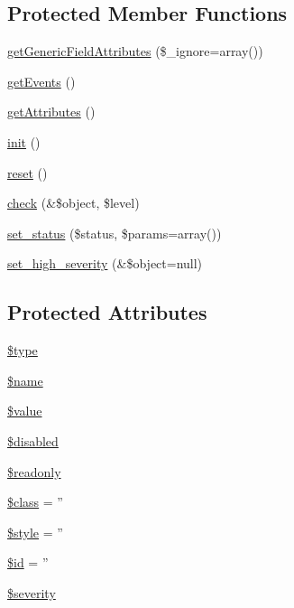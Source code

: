 \subsection*{Protected Member Functions}
\begin{DoxyCompactItemize}
\item 
\hyperlink{classFormField_a9f9d136ba8b4a793f22370aff43d592d}{getGenericFieldAttributes} (\$\_\-ignore=array())
\item 
\hyperlink{classBaseElement_a852277a83d867417f2e39e8a2483bac7}{getEvents} ()
\item 
\hyperlink{classBaseElement_a25bed980efe965e95dc43d7c2fa1faca}{getAttributes} ()
\item 
\hyperlink{class__OWL_ae0ef3ded56e8a6b34b6461e5a721cd3e}{init} ()
\item 
\hyperlink{class__OWL_a2f2a042bcf31965194c03033df0edc9b}{reset} ()
\item 
\hyperlink{class__OWL_ad6f4f6946f40199dd0333cf219fa500e}{check} (\&\$object, \$level)
\item 
\hyperlink{class__OWL_aea912d0ede9b3c2a69b79072d94d4787}{set\_\-status} (\$status, \$params=array())
\item 
\hyperlink{class__OWL_a576829692a3b66e3d518853bf43abae3}{set\_\-high\_\-severity} (\&\$object=null)
\end{DoxyCompactItemize}
\subsection*{Protected Attributes}
\begin{DoxyCompactItemize}
\item 
\hyperlink{classFormField_a37bed21a1891e95be0e4a697e45ba51b}{\$type}
\item 
\hyperlink{classFormField_a23861f707bcd77bbace6300de9621746}{\$name}
\item 
\hyperlink{classFormField_a3c01e89834248eec8e2f145fbcfa0fbc}{\$value}
\item 
\hyperlink{classFormField_ab6f1907061890290e32cb2befc0a5f50}{\$disabled}
\item 
\hyperlink{classFormField_a78ba5d4b9127e75e8ccf86f397b5d9ac}{\$readonly}
\item 
\hyperlink{classBaseElement_a99976a8e967db92e7800309f359b0803}{\$class} = ''
\item 
\hyperlink{classBaseElement_a429a3d642dd95f30e1059ef29564b87d}{\$style} = ''
\item 
\hyperlink{classBaseElement_a11b6989c43b53869a09f5ce65aa55b45}{\$id} = ''
\item 
\hyperlink{class__OWL_ad26b40a9dbbacb33e299b17826f8327c}{\$severity}
\end{DoxyCompactItemize}
